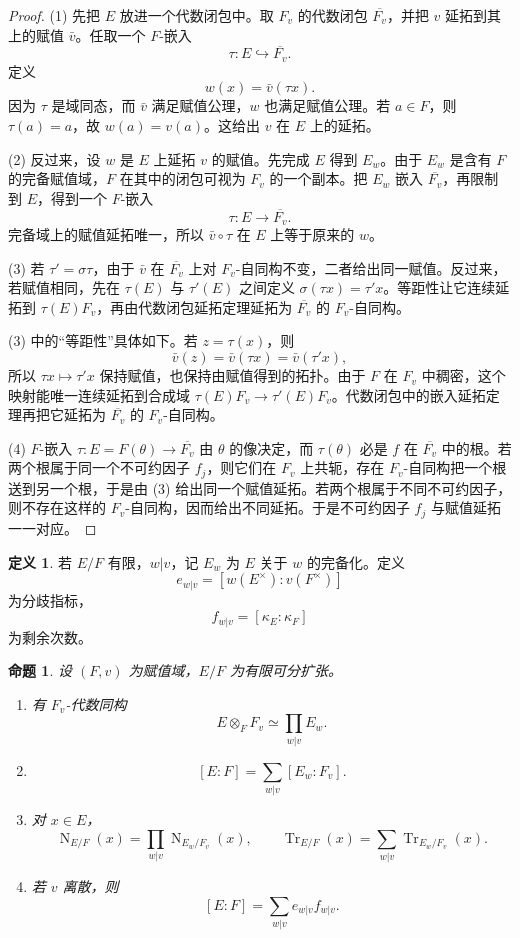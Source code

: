 \documentclass[11pt,a4paper,openany]{ctexbook}
\numberwithin{equation}{chapter}
\newcommand{\Tr}{\operatorname{Tr}}
\newcommand{\Nm}{\operatorname{N}}
\theoremstyle{plain}
\newtheorem{proposition}[theorem]{命题}
\theoremstyle{definition}
\newtheorem{definition}[theorem]{定义}
\theoremstyle{remark}
\begin{document}
\begin{proof}
(1) 先把 $E$ 放进一个代数闭包中。取 $F_v$ 的代数闭包
\(\overline{F_v}\)，并把 $v$ 延拓到其上的赋值 $\bar v$。任取一个
$F$-嵌入
\[
\tau:E\hookrightarrow\overline{F_v}.
\]
定义
\[
w(x)=\bar v(\tau x).
\]
因为 $\tau$ 是域同态，而 $\bar v$ 满足赋值公理，$w$ 也满足赋值公理。若
$a\in F$，则 $\tau(a)=a$，故 $w(a)=v(a)$。这给出 $v$ 在 $E$ 上的延拓。

(2) 反过来，设 $w$ 是 $E$ 上延拓 $v$ 的赋值。先完成 $E$ 得到 $E_w$。由于
$E_w$ 是含有 $F$ 的完备赋值域，$F$ 在其中的闭包可视为 $F_v$ 的一个副本。把
$E_w$ 嵌入 $\overline{F_v}$，再限制到 $E$，得到一个 $F$-嵌入
\[
\tau:E\to\overline{F_v}.
\]
完备域上的赋值延拓唯一，所以 $\bar v\circ\tau$ 在 $E$ 上等于原来的 $w$。

(3) 若 $\tau'=\sigma\tau$，由于 $\bar v$ 在 $\overline{F_v}$ 上对 $F_v$-自同构不变，二者给出同一赋值。反过来，若赋值相同，先在 $\tau(E)$ 与 $\tau'(E)$ 之间定义 $\sigma(\tau x)=\tau'x$。等距性让它连续延拓到 $\tau(E)F_v$，再由代数闭包延拓定理延拓为 $\overline{F_v}$ 的 $F_v$-自同构。

(3) 中的“等距性”具体如下。若 $z=\tau(x)$，则
\[
\bar v(z)=\bar v(\tau x)=\bar v(\tau' x),
\]
所以 $\tau x\mapsto\tau'x$ 保持赋值，也保持由赋值得到的拓扑。由于 $F$ 在
$F_v$ 中稠密，这个映射能唯一连续延拓到合成域
\(\tau(E)F_v\to\tau'(E)F_v\)。代数闭包中的嵌入延拓定理再把它延拓为
\(\overline{F_v}\) 的 $F_v$-自同构。

(4) $F$-嵌入 $\tau:E=F(\theta)\to\overline{F_v}$ 由 $\theta$ 的像决定，而
\(\tau(\theta)\) 必是 $f$ 在 \(\overline{F_v}\) 中的根。若两个根属于同一个不可约因子
$f_j$，则它们在 $F_v$ 上共轭，存在 $F_v$-自同构把一个根送到另一个根，于是由 (3) 给出同一个赋值延拓。若两个根属于不同不可约因子，则不存在这样的
$F_v$-自同构，因而给出不同延拓。于是不可约因子 $f_j$ 与赋值延拓一一对应。
\end{proof}

\begin{definition}
若 $E/F$ 有限，$w|v$，记 $E_w$ 为 $E$ 关于 $w$ 的完备化。定义
\[
e_{w|v}=[w(E^\times):v(F^\times)]
\]
为分歧指标，
\[
f_{w|v}=[\kappa_E:\kappa_F]
\]
为剩余次数。
\end{definition}

\begin{proposition}
设 $(F,v)$ 为赋值域，$E/F$ 为有限可分扩张。
\begin{enumerate}[label=(\arabic*)]
\item 有 $F_v$-代数同构
\[
E\otimes_FF_v\simeq\prod_{w|v}E_w.
\]
\item
\[
[E:F]=\sum_{w|v}[E_w:F_v].
\]
\item 对 $x\in E$，
\[
\Nm_{E/F}(x)=\prod_{w|v}\Nm_{E_w/F_v}(x),
\qquad
\Tr_{E/F}(x)=\sum_{w|v}\Tr_{E_w/F_v}(x).
\]
\item 若 $v$ 离散，则
\[
[E:F]=\sum_{w|v}e_{w|v}f_{w|v}.
\]
\end{enumerate}
\end{proposition}
\end{document}
